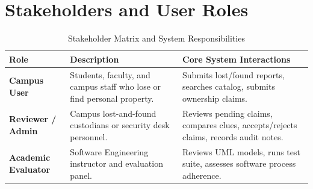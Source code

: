 \documentclass[11pt,a4paper]{article}
\begin{document}
\section{Stakeholders and User Roles}
\begin{table}[H]
    \centering
    \caption{Stakeholder Matrix and System Responsibilities}
    \begin{tabularx}{\textwidth}{lXp{4.5cm}}
        \toprule
        \textbf{Role} & \textbf{Description} & \textbf{Core System Interactions} \\
        \midrule
        \textbf{Campus User} & Students, faculty, and campus staff who lose or find personal property. & Submits lost/found reports, searches catalog, submits ownership claims. \\
        \textbf{Reviewer / Admin} & Campus lost-and-found custodians or security desk personnel. & Reviews pending claims, compares clues, accepts/rejects claims, records audit notes. \\
        \textbf{Academic Evaluator} & Software Engineering instructor and evaluation panel. & Reviews UML models, runs test suite, assesses software process adherence. \\
        \bottomrule
    \end{tabularx}
\end{table}

\end{document}
